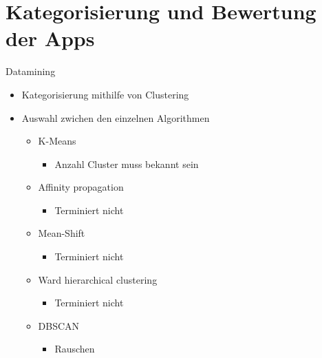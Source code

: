 \documentclass[compress,t]{beamer}
\begin{document}
\section{Kategorisierung und Bewertung der Apps}

\begin{frame}{Datamining}

    \begin{itemize}
        \item Kategorisierung mithilfe von Clustering
        \item Auswahl zwichen den einzelnen Algorithmen
            \begin{itemize}
                \item K-Means
                    \begin{itemize}
                        \item Anzahl Cluster muss bekannt sein
                    \end{itemize}
                \item Affinity propagation
                    \begin{itemize}
                        \item Terminiert nicht
                    \end{itemize}
                \item Mean-Shift
                    \begin{itemize}
                        \item Terminiert nicht
                    \end{itemize}
                \item Ward hierarchical clustering
                    \begin{itemize}
                        \item Terminiert nicht
                    \end{itemize}
                \item DBSCAN
                    \begin{itemize}
                        \item Rauschen
                    \end{itemize}
            \end{itemize}
    \end{itemize}

\end{frame}
\end{document}
